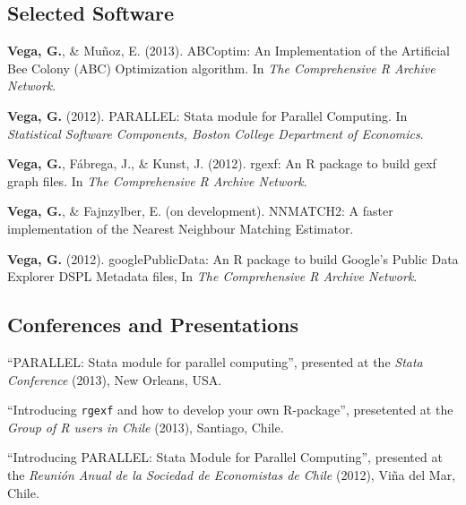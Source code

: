 \documentclass[letterpaper, 12pt]{article}
\renewenvironment{itemize}{
  \begin{list}{}{
    \setlength{\leftmargin}{0.45cm}
  }
}{
  \end{list}
}
\begin{document}
\subsection*{Selected Software}
\begin{itemize}
\item {\bf Vega, G.}, \& Mu\~noz, E. (2013). ABCoptim: An Implementation of the Artificial Bee Colony (ABC) Optimization algorithm. In {\it The Comprehensive R Archive Network}.
\item {\bf Vega, G.} (2012). PARALLEL: Stata module for Parallel Computing. In {\it Statistical Software Components, Boston College Department of Economics}.
\item {\bf Vega, G.}, F\'abrega, J., \& Kunst, J. (2012). rgexf: An R package to build gexf graph files. In {\it The Comprehensive R Archive Network}.
\item {\bf Vega, G.}, \& Fajnzylber, E. (on development). NNMATCH2: A faster implementation of the Nearest Neighbour Matching Estimator.
\item {\bf Vega, G.} (2012). googlePublicData: An R package to build Google's Public Data Explorer DSPL Metadata files, In {\it The Comprehensive R Archive Network}.
\end{itemize}

\subsection*{Conferences and Presentations}

\begin{itemize}
\item ``PARALLEL: Stata module for parallel computing'', presented at the {\it Stata Conference} (2013), New Orleans, USA.
\item ``Introducing {\tt rgexf} and how to develop your own R-package'', presetented at the {\it Group of R users in Chile} (2013), Santiago, Chile.
\item ``Introducing PARALLEL: Stata Module for Parallel Computing'', presented at the {\it Reuni\'on Anual de la Sociedad de Economistas de Chile} (2012), Vi\~na del Mar, Chile.
\end{itemize}

\end{document}
